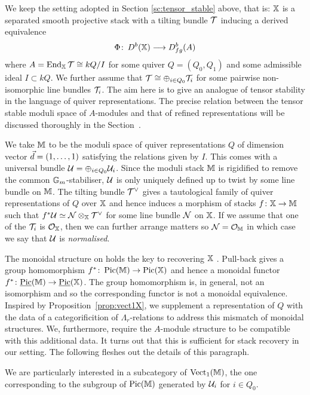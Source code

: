 \documentclass[12pt]{amsart}
\begin{document}
We keep the setting adopted in Section \ref{sc:tensor_stable} above, that is: $\mathbb{X}$ is a separated smooth projective stack with a tilting bundle $\mathcal{T}$ inducing a derived equivalence $$\Phi \colon \, D^b(\mathbb{X}) \longrightarrow D^b_{fg}(A)$$ where $A=\operatorname{End}_{\mathbb{X}} \mathcal{T} \cong kQ/I$ for some quiver $Q = (Q_0,Q_1)$ and some admissible ideal $I\subset kQ$. 
We further assume that $\mathcal{T} \cong \oplus_{i\in Q_0} \mathcal{T}_i$ for some pairwise non-isomorphic line bundles $\mathcal{T}_i$.
The aim here is to give an analogue of tensor stability in the language of quiver representations.
The precise relation between the tensor stable moduli space of $A$-modules and that of refined representations will be discussed thoroughly in the Section~\label{sc:Picard}.

We take $\mathbb{M}$ to be the moduli space of quiver representations $Q$ of dimension vector ${\vec{d}} = (1, \ldots, 1)$ satisfying the relations given by $I$. 
This comes with a universal bundle $\mathcal{U}  = \oplus_{i \in Q_0} \mathcal{U}_i$.
Since the moduli stack $\mathbb{M}$ is rigidified to remove the common $\mathbb{G}_m$-stabiliser, $\mathcal{U}$ is only uniquely defined up to twist by some line bundle on $\mathbb{M}$.
The tilting bundle $\mathcal{T}^{\vee}$ gives a tautological family of quiver representations of $Q$ over $\mathbb{X}$ and hence induces a morphism of stacks $f \colon \mathbb{X} \rightarrow \mathbb{M}$ such that $f^* \mathcal{U} \simeq \mathcal{N} \otimes_{\mathbb{X}} \mathcal{T}^{\vee}$ for some line bundle $\mathcal{N}$ on $\mathbb{X}$.
If we assume that one of the $\mathcal{T}_i$ is $\mathcal{O}_{\mathbb{X}}$, then we can further arrange matters so $\mathcal{N} = \mathcal{O}_{\mathbb{M}}$ in which case we say that $\mathcal{U}$ is {\em normalised}.

The monoidal structure on holds the key to recovering $\mathbb{X}$ \cite{Lurie}.
Pull-back gives a group homomorphism $f^* \colon \operatorname{Pic}(\mathbb{M}) \rightarrow \operatorname{Pic}(\mathbb{X})$ and hence a monoidal functor $f^* \colon \underline{\operatorname{Pic}}(\mathbb{M}) \rightarrow \underline{\operatorname{Pic}}(\mathbb{X})$.
The group homomorphism is, in general, not an isomorphism and so the corresponding functor is not a monoidal equivalence.
Inspired by Proposition~\ref{prop:vect1X}, we supplement a representation of $Q$ with the data of a categorificition of $\Lambda_r$-relations to address this mismatch of monoidal structures.
We, furthermore, require the $A$-module structure to be compatible with this additional data.
It turns out that this is sufficient for stack recovery in our setting.
The following fleshes out the details of this paragraph.

We are particularly interested in a subcategory of $\text{Vect}_1(\mathbb{M})$, the one corresponding to the subgroup of $\operatorname{Pic}(\mathbb{M})$ generated by $\mathcal{U}_i$ for $i \in Q_0$.
\end{document}
